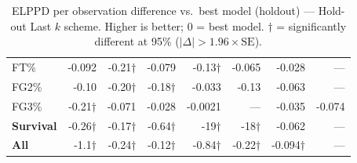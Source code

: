 \documentclass{article}
\begin{document}
\begin{table}[H]
{\begin{tabular}{lrrrrrrr}
FT\% & -0.092 & -0.21$\dagger$ & -0.079 & -0.13$\dagger$ & -0.065 & -0.028 & --- \\[2pt]
FG2\% & -0.10 & -0.20$\dagger$ & -0.18$\dagger$ & -0.033 & -0.13 & -0.063 & --- \\[2pt]
FG3\% & -0.21$\dagger$ & -0.071 & -0.028 & -0.0021 & --- & -0.035 & -0.074 \\[2pt]
\midrule
\textbf{Survival} & -0.26$\dagger$ & -0.17$\dagger$ & -0.64$\dagger$ & -19$\dagger$ & -18$\dagger$ & -0.062 & --- \\
\midrule
\textbf{All} & -1.1$\dagger$ & -0.24$\dagger$ & -0.12$\dagger$ & -0.84$\dagger$ & -0.22$\dagger$ & -0.094$\dagger$ & --- \\
\bottomrule
\end{tabular}
}
\caption{ELPPD per observation difference vs.\ best model (holdout) --- Hold-out Last $k$ scheme. Higher is better; 0 = best model. $\dagger$ = significantly different at 95\% ($|\Delta|>1.96\times\mathrm{SE}$).}
\label{tab:elppd_holdout_last_k}
\end{table}
\end{document}

